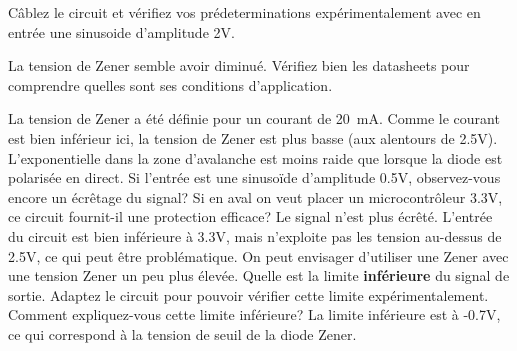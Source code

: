 \documentclass{../template/labo}
\begin{document}
\begin{manip}

\Question
{Câblez le circuit et vérifiez vos prédeterminations expérimentalement avec en entrée une sinusoide d'amplitude 2V. 
\begin{astuce}
	La tension de Zener semble avoir diminué.
	Vérifiez bien les datasheets pour comprendre quelles sont ses conditions d'application.
\end{astuce}
}
{La tension de Zener a été définie pour un courant de 20~mA. Comme le courant est bien inférieur ici, la tension de Zener est plus basse (aux alentours de 2.5V). L'exponentielle dans la zone d'avalanche est moins raide que lorsque la diode est polarisée en direct. }
\label{Q:zener_4}
\Question
{Si l'entrée est une sinusoïde d'amplitude 0.5V, observez-vous encore un écrêtage du signal? Si en aval on veut placer un microcontrôleur 3.3V, ce circuit fournit-il une protection efficace? }
{Le signal n'est plus écrêté. L'entrée du circuit est bien inférieure à 3.3V, mais n'exploite pas les tension au-dessus de 2.5V, ce qui peut être problématique. On peut envisager d'utiliser une Zener avec une tension Zener un peu plus élevée.
}
\label{Q:zener_4}
\Question
{Quelle est la limite {\bf inférieure} du signal de sortie. Adaptez le circuit pour pouvoir vérifier cette limite expérimentalement. Comment expliquez-vous cette limite inférieure? }
{La limite inférieure est à -0.7V, ce qui correspond à la tension de seuil de la diode Zener. }
\label{Q:zener_5}

\end{manip}
\end{document}

